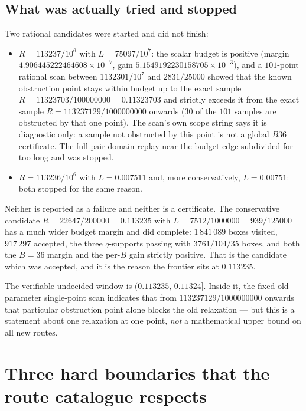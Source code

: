 \subsection{What was actually tried and stopped}

Two rational candidates were started and did not finish:

\begin{itemize}[leftmargin=1.4em,itemsep=2pt]
\item $R=113237/10^{6}$ with $L=75097/10^{7}$: the scalar budget is positive
(margin $4.906445222464608\times10^{-7}$, gain $5.1549192230158705\times10^{-3}$), and a
$101$-point rational scan between $1132301/10^{7}$ and $2831/25000$ showed that the known
obstruction point stays within budget up to the exact sample
$R=11323703/100000000=0.11323703$ and strictly exceeds it from the exact sample
$R=113237129/1000000000$ onwards ($30$ of the $101$ samples are obstructed by that one point). The
scan's own scope string says it is diagnostic only: a sample not obstructed by this point is not a
global $B36$ certificate. The full pair-domain replay near the budget edge subdivided for too long
and was stopped.
\item $R=113236/10^{6}$ with $L=0.007511$ and, more conservatively, $L=0.00751$: both stopped for the
same reason.
\end{itemize}

Neither is reported as a failure and neither is a certificate. The conservative candidate
$R=22647/200000=0.113235$ with $L=7512/1000000=939/125000$ has a much wider budget margin and did
complete: $1\,841\,089$ boxes visited, $917\,297$ accepted, the three $q$-supports passing with
$3761/104/35$ boxes, and both the $B=36$ margin and the per-$B$ gain strictly positive. That is the
candidate which was accepted, and it is the reason the frontier sits at $0.113235$.

\begin{remark}
The verifiable undecided window is $(0.113235,\,0.11324]$. Inside it, the fixed-old-parameter
single-point scan indicates that from $113237129/1000000000$ onwards that particular obstruction
point alone blocks the old relaxation --- but this is a statement about one relaxation at one point,
\emph{not} a mathematical upper bound on all new routes.
\end{remark}

\section{Three hard boundaries that the route catalogue respects}

